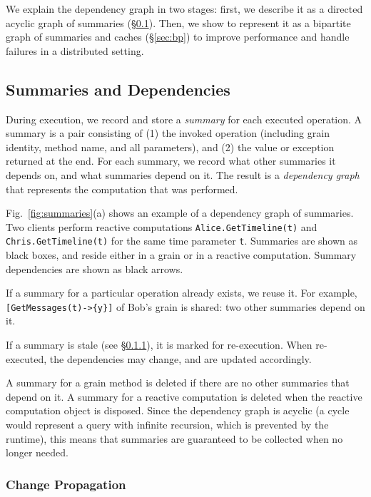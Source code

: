 We explain the dependency graph in two stages: first, we describe it as a directed acyclic graph of summaries (\S\ref{sec:summaries}). Then, we show to represent it as a bipartite graph of summaries and caches (\S\ref{sec:bp}) to improve performance and handle failures in a distributed setting. 

\subsection{Summaries and Dependencies}\label{sec:summaries}

During execution, we record and store a \emph{summary} for each executed operation. A summary is a pair consisting of (1) the invoked operation (including grain identity, method name, and all parameters), and (2) the value or exception returned at the end. For each summary, we record what other summaries it depends on, and what summaries depend on it. The result is a \emph{dependency graph} that represents the computation that was performed.

Fig.~\ref{fig:summaries}(a) shows an example of a dependency graph of summaries. Two clients perform reactive computations \lstinline|Alice.GetTimeline(t)| and \lstinline|Chris.GetTimeline(t)| for the same time parameter \lstinline|t|. Summaries are shown as black boxes, and reside either in a grain or in a reactive computation. Summary dependencies are shown as black arrows.

 If a summary for a particular operation already exists, we reuse it. For example, \lstinline|[GetMessages(t)->{y}]| of Bob's grain is shared: two other summaries depend on it. 

 If a summary is stale (see \S\ref{sec:cp}), it is marked for re-execution. When re-executed, the dependencies may change, and are updated accordingly. 

 A summary for a grain method is deleted if there are no other summaries that depend on it.  A summary for a reactive computation is deleted when the reactive computation object is disposed. Since the dependency graph is acyclic (a cycle would represent a query with infinite recursion, which is prevented by the runtime), this means that summaries are guaranteed to be collected when no longer needed.  

\subsubsection{Change Propagation}\label{sec:cp}

